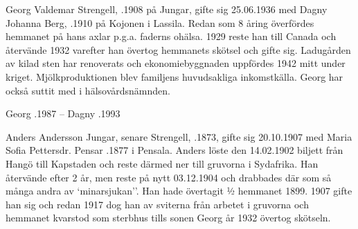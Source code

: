 Georg Valdemar Strengell, .1908 på Jungar, gifte sig 25.06.1936 med Dagny Johanna Berg, .1910 på Kojonen i Lassila. Redan som 8 åring överfördes hemmanet på hans axlar p.g.a. faderns ohälsa. 1929 reste han till Canada och återvände 1932 varefter han övertog hemmanets skötsel och gifte sig. Ladugården av kilad sten har renoverats och ekonomiebyggnaden uppfördes 1942 mitt under kriget. Mjölkproduktionen blev familjens huvudsakliga inkomstkälla. Georg har också suttit med i hälsovårdsnämnden.
\begin{jhchildren}
  \item {}
  \item {}
  \item {}
  \item {}
\end{jhchildren}
Georg .1987  --  Dagny .1993


Anders Andersson Jungar, senare Strengell, .1873, gifte sig 20.10.1907 med Maria Sofia Pettersdr. Pensar .1877 i Pensala. Anders löste den 14.02.1902 biljett från Hangö till Kapstaden och reste därmed ner till gruvorna i Sydafrika. Han återvände efter 2 år, men reste på nytt 03.12.1904 och drabbades där som så många andra av `minarsjukan''. Han hade övertagit ½  hemmanet 1899. 1907 gifte han sig och redan 1917 dog han av sviterna från arbetet i gruvorna och hemmanet kvarstod som sterbhus tills sonen Georg år 1932 övertog skötseln.
\begin{jhchildren}
  \item {}
  \item {}
  \item {}
  \item {}
  \item {}
\end{jhchildren}

